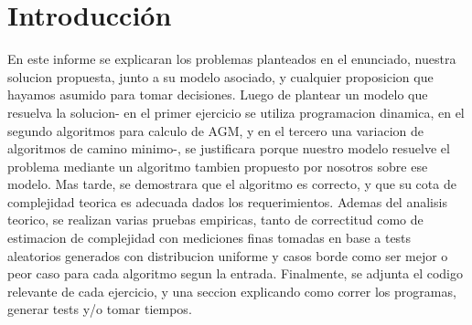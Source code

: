 \section{Introducci\'on}
En este informe se explicaran los problemas planteados en el enunciado, nuestra solucion propuesta, junto a su modelo asociado, y cualquier proposicion que hayamos asumido para tomar decisiones. Luego de plantear un modelo que resuelva la solucion- en el primer ejercicio se utiliza programacion dinamica, en el segundo algoritmos para calculo de AGM, y en el tercero una variacion de algoritmos de camino minimo-, se justificara porque nuestro modelo resuelve el problema mediante un algoritmo tambien propuesto por nosotros sobre ese modelo. Mas tarde, se demostrara que el algoritmo es correcto, y que su cota de complejidad teorica es adecuada dados los requerimientos. Ademas del analisis teorico, se realizan varias pruebas empiricas, tanto de correctitud como de estimacion de complejidad con mediciones finas tomadas en base a tests aleatorios generados con distribucion uniforme y casos borde como ser mejor o peor caso para cada algoritmo segun la entrada. Finalmente, se adjunta el codigo relevante de cada ejercicio, y una seccion explicando como correr los programas, generar tests y/o tomar tiempos.

